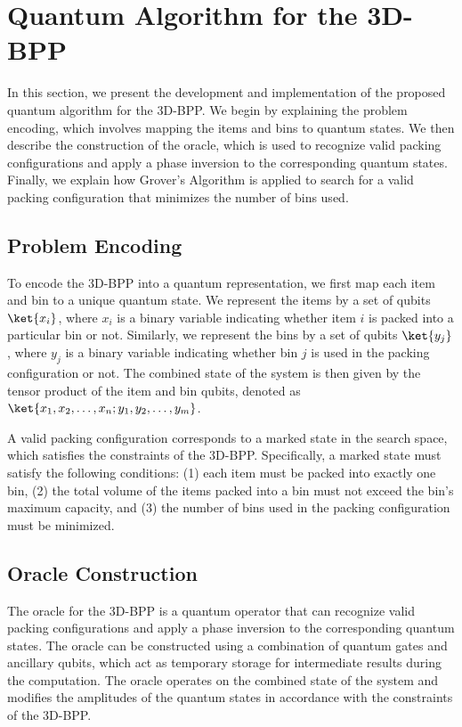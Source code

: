 \section{Quantum Algorithm for the 3D-BPP}
In this section, we present the development and implementation of the proposed quantum algorithm for the 3D-BPP. We begin by explaining the problem encoding, which involves mapping the items and bins to quantum states. We then describe the construction of the oracle, which is used to recognize valid packing configurations and apply a phase inversion to the corresponding quantum states. Finally, we explain how Grover's Algorithm is applied to search for a valid packing configuration that minimizes the number of bins used.

\subsection{Problem Encoding}
To encode the 3D-BPP into a quantum representation, we first map each item and bin to a unique quantum state. We represent the items by a set of qubits $\ket{x_i}$, where $x_i$ is a binary variable indicating whether item $i$ is packed into a particular bin or not. Similarly, we represent the bins by a set of qubits $\ket{y_j}$, where $y_j$ is a binary variable indicating whether bin $j$ is used in the packing configuration or not. The combined state of the system is then given by the tensor product of the item and bin qubits, denoted as $\ket{x_1, x_2, \ldots, x_n; y_1, y_2, \ldots, y_m}$.

A valid packing configuration corresponds to a marked state in the search space, which satisfies the constraints of the 3D-BPP. Specifically, a marked state must satisfy the following conditions: (1) each item must be packed into exactly one bin, (2) the total volume of the items packed into a bin must not exceed the bin's maximum capacity, and (3) the number of bins used in the packing configuration must be minimized.

\subsection{Oracle Construction}
The oracle for the 3D-BPP is a quantum operator that can recognize valid packing configurations and apply a phase inversion to the corresponding quantum states. The oracle can be constructed using a combination of quantum gates and ancillary qubits, which act as temporary storage for intermediate results during the computation. The oracle operates on the combined state of the system and modifies the amplitudes of the quantum states in accordance with the constraints of the 3D-BPP.

